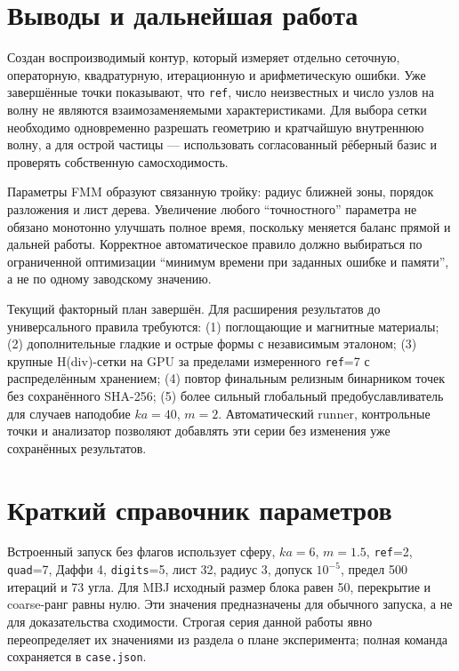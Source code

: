 \documentclass[12pt,a4paper]{article}
\begin{document}
\section{Выводы и дальнейшая работа}

Создан воспроизводимый контур, который измеряет отдельно сеточную,
операторную, квадратурную, итерационную и арифметическую ошибки. Уже завершённые
точки показывают, что \texttt{ref}, число неизвестных и число узлов на волну
не являются взаимозаменяемыми характеристиками. Для выбора сетки необходимо
одновременно разрешать геометрию и кратчайшую внутреннюю волну, а для острой
частицы --- использовать согласованный рёберный базис и проверять собственную
самосходимость.

Параметры FMM образуют связанную тройку: радиус ближней зоны, порядок
разложения и лист дерева. Увеличение любого ``точностного'' параметра не обязано
монотонно улучшать полное время, поскольку меняется баланс прямой и дальней
работы. Корректное автоматическое правило должно выбираться по ограниченной
оптимизации ``минимум времени при заданных ошибке и памяти'', а не по одному
заводскому значению.

Текущий факторный план завершён. Для расширения результатов до универсального
правила требуются: (1) поглощающие и магнитные материалы; (2) дополнительные
гладкие и острые формы с независимым эталоном; (3) крупные H(div)-сетки на GPU
за пределами измеренного \texttt{ref}=7 с распределённым хранением; (4) повтор финальным релизным
бинарником точек без сохранённого SHA-256; (5) более сильный глобальный
предобуславливатель для случаев наподобие $ka=40$, $m=2$. Автоматический
runner, контрольные точки и анализатор позволяют добавлять эти серии без
изменения уже сохранённых результатов.

\appendix
\section{Краткий справочник параметров}

Встроенный запуск без флагов использует сферу, $ka=6$, $m=1.5$,
\texttt{ref}=2, \texttt{quad}=7, Даффи 4, \texttt{digits}=5, лист 32,
радиус 3, допуск $10^{-5}$, предел 500 итераций и 73 угла. Для MBJ исходный
размер блока равен 50, перекрытие и coarse-ранг равны нулю. Эти значения
предназначены для обычного запуска, а не для доказательства сходимости.
Строгая серия данной работы явно переопределяет их значениями из раздела о
плане эксперимента; полная команда сохраняется в \texttt{case.json}.
\end{document}
